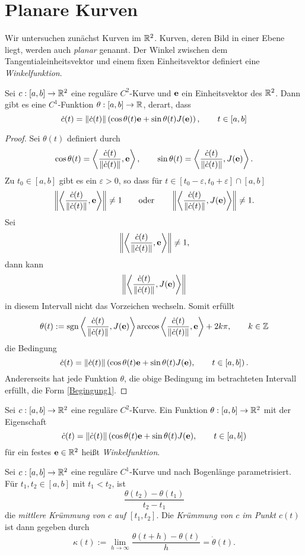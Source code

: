\documentclass[
pdftex,
oneside,
headsepline,
11pt, 
]{scrreprt}
\begin{document}
\section{Planare Kurven}
Wir untersuchen zunächst Kurven im $\mathbb{R}^2$. Kurven, deren Bild in einer Ebene liegt, werden auch \textit{planar} genannt. Der Winkel zwischen dem Tangentialeinheitsvektor und einem fixen Einheitsvektor definiert eine \textit{Winkelfunktion}.
\begin{lem}
	Sei $c:[a,b]\to \mathbb{R}^2$ eine reguläre $C^2$-Kurve und $\textnormal{\textbf{e}}$ ein Einheitsvektor des $\mathbb{R}^2$. Dann gibt es eine $C^1$-Funktion $\theta:[a,b]\to \mathbb{R}$, derart, dass \[  \dot{c}(t)=\left\lVert\dot{c}(t)\right\rVert\left(  \cos \theta(t)\textnormal{\textbf{e}}+\sin\theta(t)J(\textnormal{\textbf{e}})\right), \qquad t\in [a,b]  \]	
\end{lem}
\begin{proof}
Sei $\theta(t)$ definiert durch \[  \cos \theta(t)=\left\langle \frac{\dot{c}(t)}{\left\lVert\dot{c}(t)\right\rVert},\textnormal{\textbf{e}} \right\rangle , \qquad \sin\theta(t)= \left\langle \frac{\dot{c}(t)}{\left\lVert\dot{c}(t)\right\rVert},J(\textnormal{\textbf{e}}) \right\rangle. \]
Zu $t_0\in [a,b]$ gibt es ein $\varepsilon>0$, so dass für $t\in[t_0-\varepsilon,t_0+\varepsilon]\cap [a,b]$
\[ \left\lVert\left\langle \frac{\dot{c}(t)}{\left\lVert\dot{c}(t)\right\rVert},\textnormal{\textbf{e}} \right\rangle\right\rVert\neq 1 \qquad \textnormal{oder}\qquad \left\lVert\left\langle \frac{\dot{c}(t)}{\left\lVert\dot{c}(t)\right\rVert},J(\textnormal{\textbf{e}}) \right\rangle\right\rVert\neq 1. \] Sei \[  \left\lVert\left\langle \frac{\dot{c}(t)}{\left\lVert\dot{c}(t)\right\rVert},\textnormal{\textbf{e}} \right\rangle\right\rVert\neq 1, \] dann kann \[  \left\lVert\left\langle \frac{\dot{c}(t)}{\left\lVert\dot{c}(t)\right\rVert},J(\textnormal{\textbf{e}}) \right\rangle\right\rVert \] in diesem Intervall nicht das Vorzeichen wechseln. Somit erfüllt 
\begin{align}\label{Begingung1}
\theta(t):=\operatorname{sgn}\left\langle \frac{\dot{c}(t)}{\left\lVert\dot{c}(t)\right\rVert},J(\textnormal{\textbf{e}}) \right\rangle\arccos\left\langle \frac{\dot{c}(t)}{\left\lVert\dot{c}(t)\right\rVert},\textnormal{\textbf{e}} \right\rangle+2k\pi,\qquad k \in \mathbb{Z} 
\end{align}die Bedingung \[\dot{c}(t)=\left\lVert\dot{c}(t)\right\rVert\left(  \cos \theta(t)\textnormal{\textbf{e}}+\sin\theta(t)J(\textnormal{\textbf{e}}), \qquad t\in [a,b]  \right). \] Andererseits hat jede Funktion $\theta$, die obige Bedingung im betrachteten Intervall erfüllt, die Form \ref{Begingung1}.
\end{proof}
\begin{de}[Winkelfunktion]
	Sei $c:[a,b]\to \mathbb{R}^2$ eine reguläre $C^2$-Kurve. Ein Funktion $\theta:[a,b]\to\mathbb{R}^2$ mit der Eigenschaft \[  \dot{c}(t)=\left\lVert\dot{c}(t)\right\rVert\left(  \cos \theta(t)\textnormal{\textbf{e}}+\sin\theta(t)J(\textnormal{\textbf{e}}), \qquad t\in [a,b]  \right) \]
	für ein festes $\textnormal{\textbf{e}}\in\mathbb{R}^2$ heißt \textit{Winkelfunktion}.
\end{de}
\begin{de}
	Sei $c:[a,b]\to \mathbb{R}^2$ eine reguläre $C^1$-Kurve und nach Bogenlänge parametrisiert. Für $t_1,t_2\in[a,b]$ mit $t_1<t_2$, ist \[ \frac{\theta(t_2)-\theta(t_1)}{t_2-t_1} \] die \textit{mittlere Krümmung von $c$ auf $[t_1,t_2]$}. Die \textit{Krümmung von $c$ im Punkt $c(t)$} ist dann gegeben durch \[ \kappa(t):=\lim_{h\to \infty} \frac{\theta(t+h)-\theta(t)}{h}=\dot{\theta}(t). \]  
\end{de}
\end{document}
